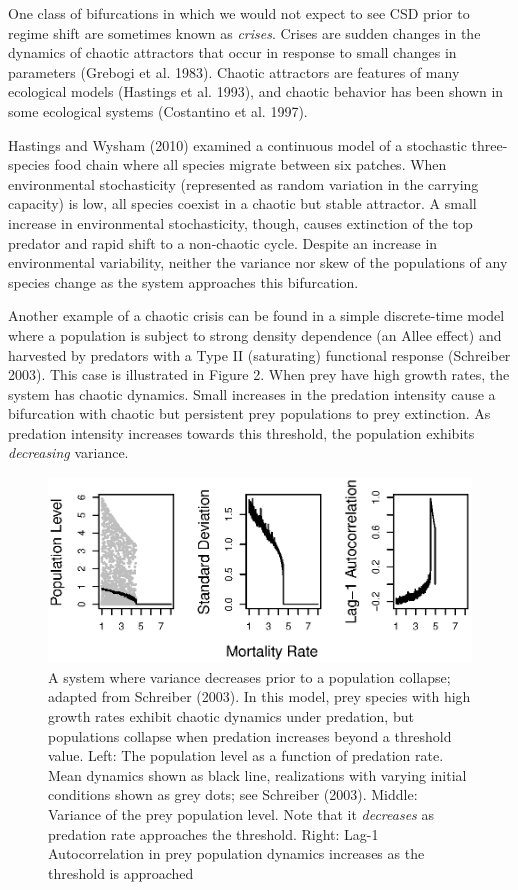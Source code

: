 \documentclass{article}
\begin{document}
One class of bifurcations in which we would not expect to see CSD prior
to regime shift are sometimes known as \emph{crises}. Crises are sudden
changes in the dynamics of chaotic attractors that occur in response to
small changes in parameters (Grebogi et al. 1983). Chaotic attractors
are features of many ecological models (Hastings et al. 1993), and
chaotic behavior has been shown in some ecological systems (Costantino
et al. 1997).

Hastings and Wysham (2010) examined a continuous model of a stochastic
three-species food chain where all species migrate between six patches.
When environmental stochasticity (represented as random variation in the
carrying capacity) is low, all species coexist in a chaotic but stable
attractor. A small increase in environmental stochasticity, though,
causes extinction of the top predator and rapid shift to a non-chaotic
cycle. Despite an increase in environmental variability, neither the
variance nor skew of the populations of any species change as the system
approaches this bifurcation.

Another example of a chaotic crisis can be found in a simple
discrete-time model where a population is subject to strong density
dependence (an Allee effect) and harvested by predators with a Type II
(saturating) functional response (Schreiber 2003). This case is
illustrated in Figure 2. When prey have high growth rates, the system
has chaotic dynamics. Small increases in the predation intensity cause a
bifurcation with chaotic but persistent prey populations to prey
extinction. As predation intensity increases towards this threshold, the
population exhibits \emph{decreasing} variance.

\begin{figure}[htbp]
\centering
\includegraphics{schreiber-fig.eps}
\caption{A system where variance decreases prior to a population
collapse; adapted from Schreiber (2003). In this model, prey species
with high growth rates exhibit chaotic dynamics under predation, but
populations collapse when predation increases beyond a threshold value.
Left: The population level as a function of predation rate. Mean
dynamics shown as black line, realizations with varying initial
conditions shown as grey dots; see Schreiber (2003). Middle: Variance of
the prey population level. Note that it \emph{decreases} as predation
rate approaches the threshold. Right: Lag-1 Autocorrelation in prey
population dynamics increases as the threshold is approached}
\end{figure}
\end{document}
